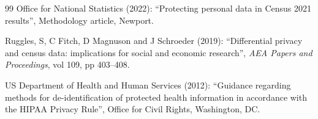 \documentclass[11pt,a4paper]{article}
\theoremstyle{plain}
\theoremstyle{definition}
\begin{document}
\begin{thebibliography}{99}
Office for National Statistics (2022): ``Protecting personal data in Census 2021 results'', Methodology article, Newport.

Ruggles, S, C Fitch, D Magnuson and J Schroeder (2019): ``Differential privacy and census data: implications for social and economic research'', \emph{AEA Papers and Proceedings}, vol 109, pp 403--408.

US Department of Health and Human Services (2012): ``Guidance regarding methods for de-identification of protected health information in accordance with the HIPAA Privacy Rule'', Office for Civil Rights, Washington, DC.

\end{thebibliography}
\end{document}
